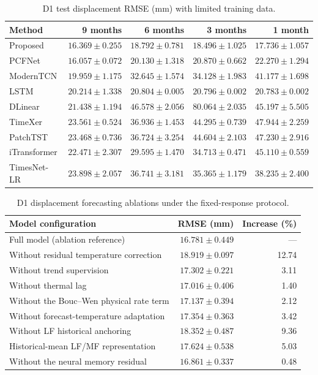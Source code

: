 \begin{table}[H]
\centering
\caption{D1 test displacement RMSE (mm) with limited training data.}
\label{tab:d1_small_sample_budgets}
\manuscripttablestyle
\setlength{\tabcolsep}{2.2pt}
\begin{tabular*}{\manuscripttablewidth}{@{\extracolsep{\fill}}lrrrr@{}}
\toprule
Method & 9 months & 6 months & 3 months & 1 month \\
\midrule
Proposed & $16.369\pm0.255$ & $\mathbf{18.792\pm0.781}$ & $\mathbf{18.496\pm1.025}$ & $\mathbf{17.736\pm1.057}$ \\
PCFNet & $\mathbf{16.057\pm0.072}$ & $20.130\pm1.318$ & $20.870\pm0.662$ & $22.270\pm1.294$ \\
ModernTCN & $19.959\pm1.175$ & $32.645\pm1.574$ & $34.128\pm1.983$ & $41.177\pm1.698$ \\
LSTM & $20.214\pm1.338$ & $20.804\pm0.005$ & $20.796\pm0.002$ & $20.783\pm0.002$ \\
DLinear & $21.438\pm1.194$ & $46.578\pm2.056$ & $80.064\pm2.035$ & $45.197\pm5.505$ \\
TimeXer & $23.561\pm0.524$ & $36.936\pm1.453$ & $44.295\pm0.739$ & $47.944\pm2.259$ \\
PatchTST & $23.468\pm0.736$ & $36.724\pm3.254$ & $44.604\pm2.103$ & $47.230\pm2.916$ \\
iTransformer & $22.471\pm2.307$ & $29.595\pm1.470$ & $34.713\pm0.471$ & $45.110\pm0.559$ \\
TimesNet-LR & $23.898\pm2.057$ & $36.741\pm3.181$ & $35.365\pm1.179$ & $38.235\pm2.400$ \\
\bottomrule
\end{tabular*}
\end{table}

\begin{table}[H]
\centering
\caption{D1 displacement forecasting ablations under the fixed-response protocol.}
\label{tab:d1_ablation}
\manuscripttablestyle
\begin{tabular*}{\manuscripttablewidth}{@{\extracolsep{\fill}}lrr@{}}
\toprule
Model configuration & RMSE (mm) & Increase (\%) \\
\midrule
Full model (ablation reference) & $\mathbf{16.781\pm0.449}$ & --- \\
Without residual temperature correction & $18.919\pm0.097$ & 12.74 \\
Without trend supervision & $17.302\pm0.221$ & 3.11 \\
Without thermal lag & $17.016\pm0.406$ & 1.40 \\
Without the Bouc--Wen physical rate term & $17.137\pm0.394$ & 2.12 \\
Without forecast-temperature adaptation & $17.354\pm0.363$ & 3.42 \\
Without LF historical anchoring & $18.352\pm0.487$ & 9.36 \\
Historical-mean LF/MF representation & $17.624\pm0.538$ & 5.03 \\
Without the neural memory residual & $16.861\pm0.337$ & 0.48 \\
\bottomrule
\end{tabular*}
\end{table}

